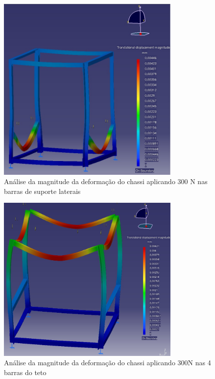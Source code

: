 \begin{figure}[H]
	\centering
	\includegraphics[width=9cm]{figuras/catia_4.jpg}
	\caption{Análise da magnitude da deformação do chassi aplicando 300 N nas barras de suporte laterais} 
	\label{catia_4}
\end{figure}

\begin{figure}[H]
	\centering
	\includegraphics[width=9cm]{figuras/catia_5.jpg}
	\caption{Análise da magnitude da deformação do chassi aplicando 300N nas 4 barras do teto} 
	\label{catia_5}
\end{figure}

